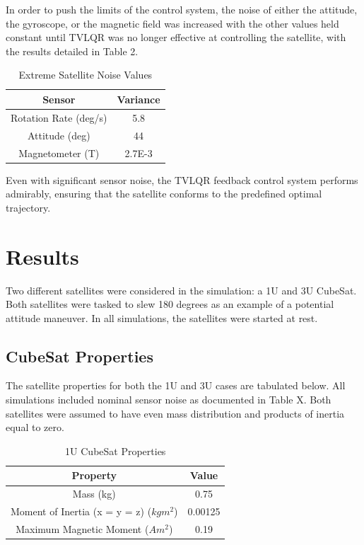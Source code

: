 \documentclass[letterpaper, preprint, paper,11pt]{IAA-AAS}	%
\begin{document}
In order to push the limits of the control system, the noise of either the attitude, the gyroscope, or the magnetic field was increased with the other values held constant until TVLQR was no longer effective at controlling the satellite, with the results detailed in Table 2.  

\begin{table}[htbp]
	\fontsize{10}{10}\selectfont
    \caption{Extreme Satellite Noise Values}
   \label{tab:label}
        \centering 
   \begin{tabular}{c | c } %
      \hline 
      Sensor & Variance\\
      \hline
      Rotation Rate (deg/s) & 5.8\\
      \hline
      Attitude (deg) & 44\\
      \hline
      Magnetometer (T) & 2.7E-3\\
      \hline
   \end{tabular}
\end{table}
Even with significant sensor noise, the TVLQR feedback control system performs admirably, ensuring that the satellite conforms to the predefined optimal trajectory. 

\section{Results}
Two different satellites were considered in the simulation: a 1U and 3U CubeSat. Both satellites were tasked to slew 180 degrees as an example of a potential attitude maneuver. In all simulations, the satellites were started at rest.   

\subsection{CubeSat Properties}
The satellite properties for both the 1U and 3U cases are tabulated below. All simulations included nominal sensor noise as documented in Table X. Both satellites were assumed to have even mass distribution and products of inertia equal to zero.

\begin{table}[htbp]
	\fontsize{10}{10}\selectfont
    \caption{1U CubeSat Properties}
   \label{tab:label}
        \centering 
   \begin{tabular}{c | c } %
      \hline 
      Property & Value\\
      \hline
      Mass (kg) & 0.75\\
      \hline
      Moment of Inertia (x = y = z) ($kgm^2$) & 0.00125\\
      \hline
      Maximum Magnetic Moment ($Am^2$) & 0.19\\
      \hline
   \end{tabular}
\end{table}
\end{document}
